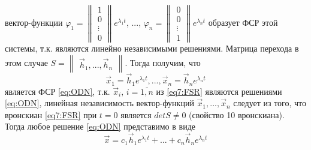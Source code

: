 вектор-функции $\varphi_1 = \begin{Vmatrix*} 1 \\ 0 \\ \vdots \\ 0 \end{Vmatrix*} e^{\lambda_1 t}$, ..., 
$\varphi_n = \begin{Vmatrix*} 0 \\ 0 \\ \vdots \\ 1 \end{Vmatrix*} e^{\lambda_n t}$ 
образует ФСР этой системы, т.к. являются линейно независимыми решениями.
Матрица перехода в этом случае $S = \begin{Vmatrix*} \vec{h}_1,  ...,  \vec{h}_n \end{Vmatrix*}$. 
Тогда получим, что \begin{equation}
  \vec{x}_1 = \vec{h}_1 e^{\lambda_1 t}, ..., \vec{x}_n = \vec{h}_n e^{\lambda_n t} \label{eq7:FSR}
\end{equation} является ФСР \eqref{eq:ODN}, т.к. $\vec{x}_i, \,i= \overline{1, n}$ из \eqref{eq7:FSR} являются решениями \eqref{eq:ODN}, 
линейная независимость вектор-функций $\vec{x}_1, ..., \vec{x}_n$ следует из того, что вронскиан \eqref{eq7:FSR} при $t=0$ является $det S \neq 0$ (свойство 10 вронскиана).
Тогда любое решение \eqref{eq:ODN} представимо в виде
\begin{equation}
  \vec{x} = c_1 \vec{h}_1 e^{\lambda_1 t} + ... + c_n \vec{h}_n e^{\lambda_n t}
\end{equation}

